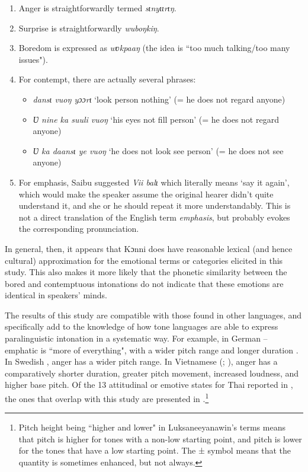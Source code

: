 \documentclass[output=paper]{langsci/langscibook}
\begin{document}
\begin{enumerate}
\item Anger is straightforwardly termed \emph{sɩnyɩɩrɩŋ}.
\item Surprise is straightforwardly \emph{wuboŋkiŋ}. 
\item Boredom is expressed as \emph{wʋkpaaŋ} (the idea is ``too much talking/too many issues").
\item For contempt, there are actually several phrases: 

\begin{itemize}
\item \emph{dansɩ vuoŋ yɔɔrɩ} `look person nothing' (= he does not regard anyone) 
\item \emph{Ʋ nine ka suuli vuoŋ} `his eyes not fill person' (= he does not regard anyone) 
\item \emph{Ʋ ka daansɩ ye vuoŋ} `he does not look see person' (= he does not see anyone)
\end{itemize}
\item For emphasis, Saibu suggested \textit{Vii balɩ} which literally means `say it again', which would make the speaker assume the original hearer didn't quite understand it, and she or he should repeat it more understandably. This is not a direct translation of the English term \emph{emphasis}, but probably evokes the corresponding pronunciation.
\end{enumerate}

In general, then, it appears that Kɔnni does have reasonable lexical (and hence cultural) approximation for the emotional terms or categories elicited in this study. This also makes it more likely that the phonetic similarity between the bored and contemptuous intonations do not indicate that these emotions are identical in speakers' minds. 

The results of this study are compatible with those found in other languages, and specifically add to the knowledge of how tone languages are able to express paralinguistic intonation in a systematic way. For example, in German -- emphatic is ``more of everything", with a wider pitch range and longer duration \citep[91]{gibbon1998}.  In Swedish \citep[122--123]{garding1998}, anger has a wider pitch range. In Vietnamese (\citealt[402, 412--413]{doetal1998}; \citealt{brunelleetal2012}), anger has a comparatively shorter duration, greater pitch movement, increased loudness, and higher base pitch. Of the 13 attitudinal or emotive states for Thai reported in \citet[382]{luksaneeyanawin1998}, the ones that overlap with this study are presented in .\footnote{Pitch height being ``higher and lower" in Luksaneeyanawin's terms means that pitch is higher for tones with a non-low starting point, and pitch is lower for the tones that have a low starting point. The ± symbol means that the quantity is sometimes enhanced, but not always.}
\end{document}
